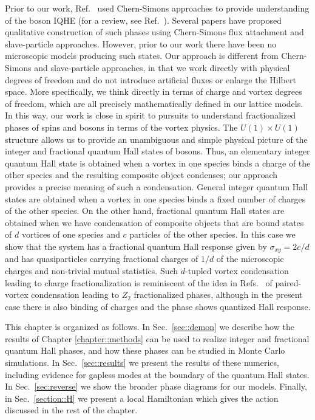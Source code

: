 Prior to our work, Ref.~\cite{LuVishwanath2012} used Chern-Simons approaches to provide understanding of the boson IQHE (for a review, see Ref.~\cite{TurnerVishwanath2013}).  Several papers have proposed qualitative construction of such phases using Chern-Simons flux attachment\cite{SenthilLevin2012} and slave-particle approaches.\cite{GroverVishwanath2012, LuLee2012_QPT, LuLee2012_S1}  However, prior to our work there have been no microscopic models producing such states.
Our approach is different from Chern-Simons and slave-particle approaches, in that we work directly with physical degrees of freedom and do not introduce artificial fluxes or enlarge the Hilbert space.  More specifically, we think directly in terms of charge and vortex degrees of freedom, which are all precisely mathematically defined in our lattice models.  In this way, our work is close in spirit to pursuits to understand fractionalized phases of spins and bosons in terms of the vortex physics.\cite{BalentsFisherNayak1999, SenthilFisher_Z2}  The $U(1) \times U(1)$ structure allows us to provide an unambiguous and simple physical picture of the integer and fractional quantum Hall states of bosons.  Thus, an elementary integer quantum Hall state is obtained when a vortex in one species binds a charge of the other species and the resulting composite object condenses; our approach provides a precise meaning of such a condensation.  General integer quantum Hall states are obtained when a vortex in one species binds a fixed number of charges of the other species.  On the other hand, fractional quantum Hall states are obtained when we have condensation of composite objects that are bound states of $d$ vortices of one species and $c$ particles of the other species.  In this case we show that the system has a fractional quantum Hall response given by $\sigma_{xy} = 2c/d$ and has quasiparticles carrying fractional charges of $1/d$ of the microscopic charges and non-trivial mutual statistics.  Such $d$-tupled vortex condensation leading to charge fractionalization is reminiscent of the idea in Refs.~\cite{BalentsFisherNayak1999, SenthilFisher_Z2} of paired-vortex condensation leading to $Z_2$ fractionalized phases, although in the present case there is also binding of charges and the phase shows quantized Hall response.

This chapter is organized as follows.  In Sec.~\ref{sec::demon} we describe how the results of Chapter \ref{chapter::methods} can be used to realize integer and fractional quantum Hall phases, and how these phases can be studied in Monte Carlo simulations.  In Sec.~\ref{sec::results} we present the results of these numerics, including evidence for gapless modes at the boundary of the quantum Hall states.  In Sec.~\ref{sec:reverse} we show the broader phase diagrams for our models.  
Finally, in Sec.~\ref{section::H} we present a local Hamiltonian which gives the action discussed in the rest of the chapter.



